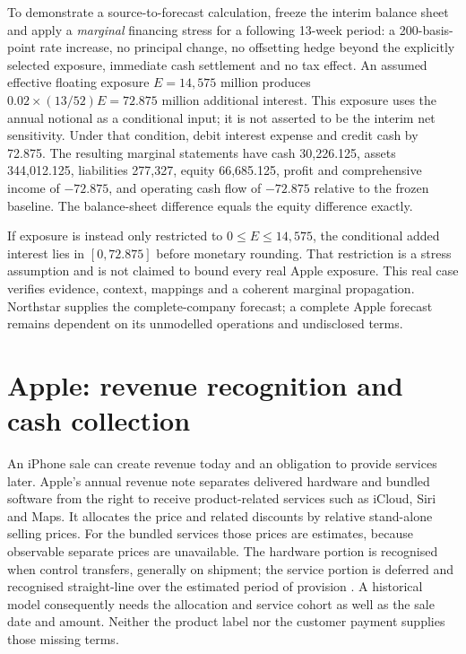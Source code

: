 To demonstrate a source-to-forecast calculation, freeze the interim balance
sheet and apply a \emph{marginal} financing stress for a following 13-week
period: a 200-basis-point rate increase, no principal change, no offsetting
hedge beyond the explicitly selected exposure, immediate cash settlement and
no tax effect. An assumed effective floating exposure $E=14{,}575$ million
produces $0.02\times(13/52)E=72.875$ million additional interest. This exposure
uses the annual notional as a conditional input; it is not asserted to be the
interim net sensitivity. Under that condition, debit interest expense and
credit cash by 72.875. The resulting marginal statements have cash 30,226.125,
assets 344,012.125, liabilities 277,327, equity 66,685.125, profit and comprehensive
income of $-72.875$, and operating cash flow of $-72.875$ relative to the frozen
baseline. The balance-sheet difference equals the equity difference exactly.

If exposure is instead only restricted to $0\leq E\leq14{,}575$, the
conditional added interest lies in $[0,72.875]$ before monetary rounding. That
restriction is a stress assumption and is not claimed to bound every real
Apple exposure. This real case verifies evidence, context, mappings and a
coherent marginal propagation. Northstar supplies the complete-company
forecast; a complete Apple forecast remains dependent on its unmodelled
operations and undisclosed terms.

\section{Apple: revenue recognition and cash collection}
\label{sec:apple-revenue}

An iPhone sale can create revenue today and an obligation to provide services
later. Apple's annual revenue note separates delivered hardware and bundled
software from the right to receive product-related services such as iCloud,
Siri and Maps. It allocates the price and related discounts by relative
stand-alone selling prices. For the bundled services those prices are estimates,
because observable separate prices are unavailable. The hardware portion is
recognised when control transfers, generally on shipment; the service portion
is deferred and recognised straight-line over the estimated period of provision
\citep[Note 2, printed p.~35]{apple2024}. A historical model consequently needs
the allocation and service cohort as well as the sale date and amount. Neither
the product label nor the customer payment supplies those missing terms.

